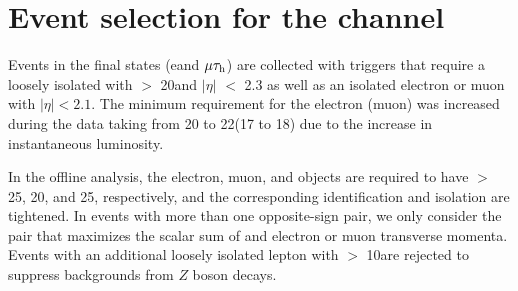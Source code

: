 \section{\texorpdfstring{Event selection for the \leptonTau channel}{Event selection for the lepton-tau channel}}
\label{sect:eleTauCuts}
Events in the \leptonTau final states (e\Tau and $\mu\tau_{\rm h}$)
are collected with triggers that require 
a loosely isolated \Tau with \PT $>$ 20\GeV and $|\eta|$ $<$ 2.3 as well as
an isolated electron\cite{Khachatryan:2015hwa} or muon\cite{Chatrchyan:2012xi} with $|\eta| < 2.1$.  The minimum
\PT requirement for the electron (muon) was increased during the data taking from 20 to 22\GeV (17 to 18\GeV)
due to the increase in instantaneous luminosity.

In the offline analysis, the electron, muon, and \Tau objects are required to have \PT $>$ 25, 20, and 25\GeV, respectively, 
and the corresponding identification and isolation are tightened.
In events with more than one opposite-sign \leptonTau pair, we only consider
 the pair that maximizes the scalar sum of \Tau and electron or muon 
transverse momenta.  Events with an additional loosely isolated lepton
with \PT $>$ 10\GeV are rejected to suppress backgrounds from $Z$ boson
decays.  

